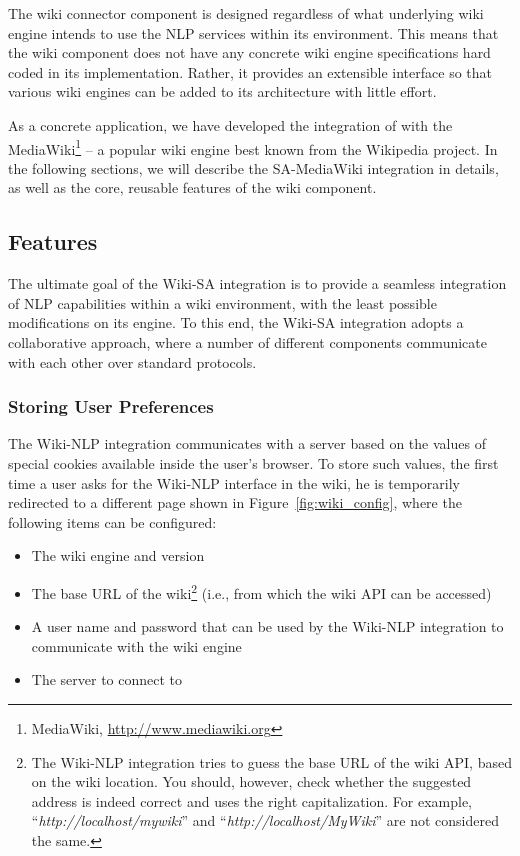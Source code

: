 The wiki connector component is designed regardless of what underlying wiki engine intends to use the NLP services within its environment. This means that the wiki component does not have any concrete wiki engine specifications hard coded in its implementation. Rather, it provides an extensible interface so that various wiki engines can be added to its architecture with little effort.

As a concrete application, we have developed the integration of \sa with the MediaWiki\footnote{MediaWiki, \url{http://www.mediawiki.org}} -- a popular wiki engine best known from the Wikipedia project. In the following sections, we will describe the SA-MediaWiki integration in details, as well as the core, reusable features of the wiki component.

\subsection{Features}
The ultimate goal of the Wiki-SA integration is to provide a seamless integration of NLP capabilities within a wiki environment, with the least possible modifications on its engine. To this end, the Wiki-SA integration adopts a collaborative approach, where a number of different components communicate with each other over standard protocols.

\subsubsection{Storing User Preferences} The Wiki-NLP integration communicates with a \sa server based on the values of special cookies available inside the user's browser. To store such values, the first time a user asks for the Wiki-NLP interface in the wiki, he is temporarily redirected to a different page shown in Figure~\ref{fig:wiki_config}, where the following items can be configured:

\begin{itemize}\itemsep1mm
\item The wiki engine and version
\item The base URL of the wiki\footnote{The Wiki-NLP integration tries to guess the base URL of the wiki API, based on the wiki location. You should, however, check whether the suggested address is indeed correct and uses the right capitalization. For example, ``\emph{http://localhost/mywiki}'' and ``\emph{http://localhost/MyWiki}'' are not considered the same.} (i.e., from which the wiki API can be accessed)
\item A user name and password that can be used by the Wiki-NLP integration to communicate with the wiki engine
\item The \sa server to connect to
\end{itemize}

